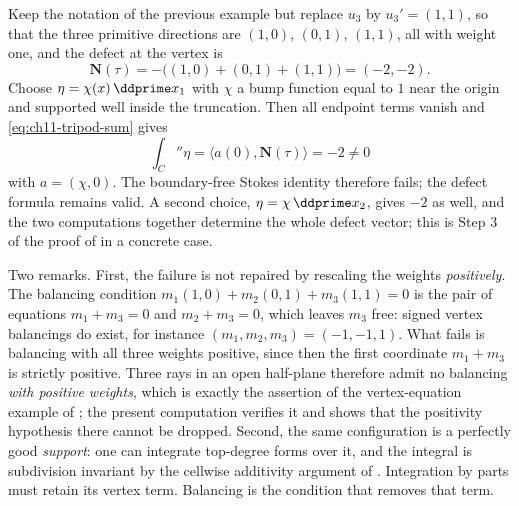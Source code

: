 \begin{example}
\label{ex:ch11-tripod-unbalanced}
Keep the notation of the previous example but replace $u_3$ by
$u_3'=(1,1)$, so that the three primitive directions are $(1,0)$, $(0,1)$,
$(1,1)$, all with weight one, and the defect at the vertex is
\[
 \mathbf N(\tau)=-\bigl((1,0)+(0,1)+(1,1)\bigr)=(-2,-2).
\]
Choose $\eta=\chi(x)\,\ddprime x_1$ with $\chi$ a bump function equal to $1$
near the origin and supported well inside the truncation.  Then all endpoint
terms vanish and \eqref{eq:ch11-tripod-sum} gives
\[
 \int_C\dprime\eta=\bigl\langle a(0),\mathbf N(\tau)\bigr\rangle=-2\neq0
\]
with $a=(\chi,0)$.  The boundary-free Stokes identity therefore fails;
the defect formula remains valid.  A second choice, $\eta=\chi\,\ddprime x_2$,
gives $-2$ as well, and the two computations together determine the whole
defect vector; this is Step 3 of the proof of
 in a concrete case.

Two remarks.  First, the failure is not repaired by rescaling the weights
\emph{positively}.  The balancing condition
$m_1(1,0)+m_2(0,1)+m_3(1,1)=0$ is the pair of equations $m_1+m_3=0$ and
$m_2+m_3=0$, which leaves $m_3$ free: signed vertex balancings do exist, for
instance $(m_1,m_2,m_3)=(-1,-1,1)$.  What fails is balancing with all three
weights positive, since then the first coordinate $m_1+m_3$ is strictly
positive.  Three rays in an open half-plane therefore admit no balancing
\emph{with positive weights}, which is exactly the assertion of the
vertex-equation example of ; the present
computation verifies it and shows that the positivity hypothesis there
cannot be dropped.
Second, the same configuration is a perfectly good \emph{support}: one can
integrate top-degree forms over it, and the integral is subdivision
invariant by the cellwise additivity argument of
.  Integration by parts must
retain its vertex term.  Balancing is the condition that removes that term.
\end{example}

